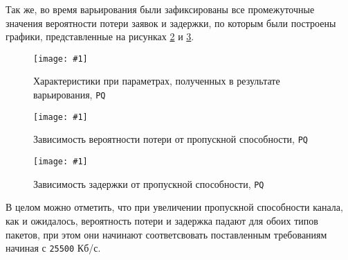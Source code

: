 \documentclass[12pt, a4paper]{article}
\newcommand{\figc}[4]{
  \begin{figure}[H]
  \begin{center}
    \texttt{[image: \#1]}
    \caption{#2}
    \label{fig:#3}
  \end{center}
  \end{figure}
}
\begin{document}
Так же, во время варьирования были зафиксированы
все промежуточные значения вероятности потери заявок и задержки, по которым
были построены графики, представленные на рисунках \ref{fig:p_l} и \ref{fig:p_d}.

\figc{op/C25_5E10OP}{Характеристики при параметрах, полученных в результате варьирования, \texttt{PQ}}{p_c}{1.0}
\figc{charts/op_loss}{Зависимость вероятности потери от пропускной способности, \texttt{PQ}}{p_l}{0.8}
\figc{charts/op_delay}{Зависимость задержки от пропускной способности, \texttt{PQ}}{p_d}{0.8}

В целом можно отметить, что при увеличении пропускной способности канала, как
и ожидалось, вероятность потери и задержка падают для обоих типов пакетов,
при этом они начинают соответсвовать поставленным требованиям начиная с \texttt{25500} Кб/с.
\end{document}
